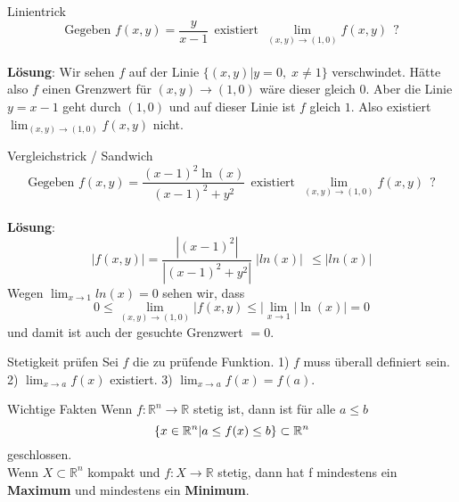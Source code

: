 \begin{Beispiel}{Linientrick}{}
\[ \text{Gegeben } f(x,y) = \frac{y}{x-1} ~~ \text{existiert} ~~ \lim_{(x,y)\rightarrow(1,0)} f(x,y) ~~ \text{?}\]
\\
\textbf{Lösung}: Wir sehen $f$ auf der Linie $\{ (x,y) | y=0, \; x \neq 1 \}$ verschwindet. Hätte also
$f$ einen Grenzwert für $(x,y) \rightarrow (1,0)$ wäre dieser gleich $0$. Aber die Linie $y=x-1$ geht
durch $(1, 0)$ und auf dieser Linie ist $f$ gleich $1$. Also existiert $\lim_{(x,y) \rightarrow (1, 0)} f(x,y)$ nicht.
\end{Beispiel}

\begin{Beispiel}{Vergleichstrick / Sandwich}{}
\[ \text{Gegeben } f(x,y) = \frac{(x-1)^2 \ln(x)}{(x-1)^2 + y^2} ~~ \text{existiert} ~~ \lim_{(x,y)\rightarrow(1,0)} f(x,y) ~~ \text{?}\]
\\
\textbf{Lösung}: 
\[ |f(x,y)| = \frac{|(x-1)^2|}{|(x-1)^2 + y^2|} \; |ln(x)| ~~ \leq |ln(x)| \]
Wegen $\lim_{x\rightarrow 1} ln(x) = 0$ sehen wir, dass 
\[ 0 \leq \lim_{(x,y) \rightarrow (1,0)} |f(x,y) \leq |\lim_{x\rightarrow 1} |\ln(x)| = 0\]
und damit ist auch der gesuchte Grenzwert $ = 0$.
\end{Beispiel}


\begin{Rezept}{Stetigkeit prüfen}{}
    Sei $f$ die zu prüfende Funktion. 1) $f$ muss überall definiert sein. 2) $\lim_{x \rightarrow a} f(x)$ existiert. 3) $\lim_{x \rightarrow a} f(x) = f(a)$.
\end{Rezept}

\begin{Diverses}{Wichtige Fakten}{}
Wenn $f: \mathbb{R}^n \rightarrow \mathbb{R}$ stetig ist, dann ist für alle $a \leq b$
\[
\{x \in \mathbb{R}^n | a \leq f(x) \leq b\} \subset \mathbb{R}^n 
\]
geschlossen. \\
Wenn  $X \subset \mathbb{R}^n$ kompakt und $f: X \rightarrow \mathbb{R}$ stetig, dann hat f mindestens ein \textbf{Maximum} und mindestens ein \textbf{Minimum}.
\end{Diverses}
